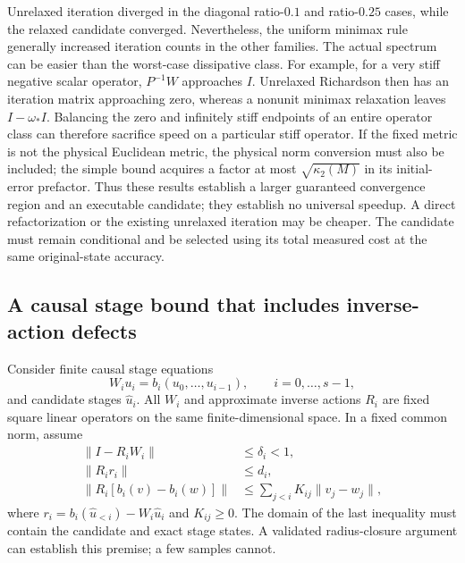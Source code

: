 Unrelaxed iteration diverged in the diagonal ratio-$0.1$ and ratio-$0.25$
cases, while the relaxed candidate converged.  Nevertheless, the uniform
minimax rule generally increased iteration counts in the other families.
The actual spectrum can be easier than the worst-case dissipative class.
For example, for a very stiff negative scalar operator,
$P^{-1}W$ approaches $I$.  Unrelaxed Richardson then has an iteration
matrix approaching zero, whereas a nonunit minimax relaxation leaves
$I-\omega_*I$.  Balancing the zero and infinitely stiff endpoints of an
entire operator class can therefore sacrifice speed on a particular stiff
operator.  If the fixed metric is not the physical Euclidean metric, the
physical norm conversion must also be included; the simple bound acquires
a factor at most $\sqrt{\kappa_2(M)}$ in its initial-error prefactor.
Thus these results establish a larger guaranteed convergence region and an
executable candidate; they establish no universal speedup.  A direct
refactorization or the existing unrelaxed iteration may be cheaper.  The
candidate must remain conditional and be selected using its total measured
cost at the same original-state accuracy.

\subsection{A causal stage bound that includes inverse-action defects}
\label{subsec:inexact-causal-theorem}

Consider finite causal stage equations
\begin{equation}
 W_i u_i=b_i(u_0,\ldots,u_{i-1}),\qquad i=0,\ldots,s-1,
\end{equation}
and candidate stages $\widehat u_i$.  All $W_i$ and approximate inverse
actions $R_i$ are fixed square linear operators on the same finite-dimensional
space.  In a fixed common norm, assume
\begin{align}
 \|I-R_iW_i\|&\leq\delta_i<1,\nonumber\\
 \|R_i r_i\|&\leq d_i,\nonumber\\
 \|R_i[b_i(v)-b_i(w)]\|
 &\leq\sum_{j<i}K_{ij}\|v_j-w_j\|,
 \label{eq:inexact-stage-premises}
\end{align}
where $r_i=b_i(\widehat u_{<i})-W_i\widehat u_i$ and $K_{ij}\geq0$.
The domain of the last inequality must contain the candidate and exact
stage states.  A validated radius-closure argument can establish this
premise; a few samples cannot.

